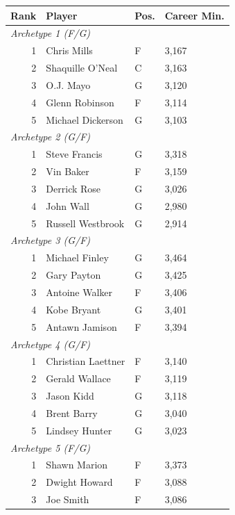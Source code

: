 \begin{table}[htbp]
  \centering\small
  \begin{tabular}{rlll}
    \toprule
    Rank & Player & Pos. & Career Min. \\
    \midrule
    \multicolumn{4}{l}{\textit{Archetype 1 (F/G)}} \\
    \midrule
    1 & Chris Mills & F & 3,167 \\
    2 & Shaquille O'Neal & C & 3,163 \\
    3 & O.J. Mayo & G & 3,120 \\
    4 & Glenn Robinson & F & 3,114 \\
    5 & Michael Dickerson & G & 3,103 \\
    \midrule[0.4pt]
    \multicolumn{4}{l}{\textit{Archetype 2 (G/F)}} \\
    \midrule
    1 & Steve Francis & G & 3,318 \\
    2 & Vin Baker & F & 3,159 \\
    3 & Derrick Rose & G & 3,026 \\
    4 & John Wall & G & 2,980 \\
    5 & Russell Westbrook & G & 2,914 \\
    \midrule[0.4pt]
    \multicolumn{4}{l}{\textit{Archetype 3 (G/F)}} \\
    \midrule
    1 & Michael Finley & G & 3,464 \\
    2 & Gary Payton & G & 3,425 \\
    3 & Antoine Walker & F & 3,406 \\
    4 & Kobe Bryant & G & 3,401 \\
    5 & Antawn Jamison & F & 3,394 \\
    \midrule[0.4pt]
    \multicolumn{4}{l}{\textit{Archetype 4 (G/F)}} \\
    \midrule
    1 & Christian Laettner & F & 3,140 \\
    2 & Gerald Wallace & F & 3,119 \\
    3 & Jason Kidd & G & 3,118 \\
    4 & Brent Barry & G & 3,040 \\
    5 & Lindsey Hunter & G & 3,023 \\
    \midrule[0.4pt]
    \multicolumn{4}{l}{\textit{Archetype 5 (F/G)}} \\
    \midrule
    1 & Shawn Marion & F & 3,373 \\
    2 & Dwight Howard & F & 3,088 \\
    3 & Joe Smith & F & 3,086 \\

\end{tabular}
\end{table}
